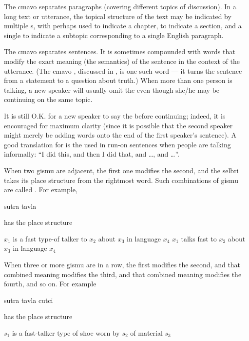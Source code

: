 The cmavo  separates paragraphs (covering different topics of discussion). In a long text or utterance, the topical structure of the text may be indicated by multiple s, with perhaps  used to indicate a chapter,  to indicate a section, and a single  to indicate a subtopic corresponding to a single English paragraph.

The cmavo  separates sentences. It is sometimes compounded with words that modify the exact meaning (the semantics) of the sentence in the context of the utterance. (The cmavo , discussed in , is one such word --- it turns the sentence from a statement to a question about truth.) When more than one person is talking, a new speaker will usually omit the  even though she/he may be continuing on the same topic.

It is still O.K. for a new speaker to say the  before continuing; indeed, it is encouraged for maximum clarity (since it is possible that the second speaker might merely be adding words onto the end of the first speaker's sentence). A good translation for  is the  used in run-on sentences when people are talking informally: ``I did this, and then I did that, and \ldots, and \ldots''.



When two gismu are adjacent, the first one modifies the second, and the selbri takes its place structure from the rightmost word. Such combinations of gismu are called . For example,
\begin{example}
sutra tavla
\end{example}

{\noindent}has the place structure
\begin{example}
$x_1$ is a fast type-of talker to $x_2$ about $x_3$ in language $x_4$\n
$x_1$ talks fast to $x_2$ about $x_3$ in language $x_4$
\end{example}

When three or more gismu are in a row, the first modifies the second, and that combined meaning modifies the third, and that combined meaning modifies the fourth, and so on. For example
\begin{example}
sutra tavla cutci
\end{example}

{\noindent}has the place structure
\begin{example}
$s_1$ is a fast-talker type of shoe worn by $s_2$ of material $s_3$
\end{example}

